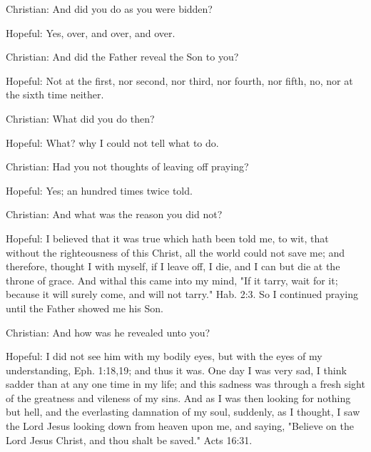 Christian: And did you do as you were bidden?

Hopeful: Yes, over, and over, and over.

Christian: And did the Father reveal the Son to you?

Hopeful: Not at the first, nor second, nor third, nor fourth, nor
fifth, no, nor at the sixth time neither.

Christian: What did you do then?

Hopeful: What? why I could not tell what to do.

Christian: Had you not thoughts of leaving off praying?

Hopeful: Yes; an hundred times twice told.

Christian: And what was the reason you did not?

Hopeful: I believed that it was true which hath been told me, to wit,
that without the righteousness of this Christ, all the world could not
save me; and therefore, thought I with myself, if I leave off, I die,
and I can but die at the throne of grace. And withal this came into my
mind, "If it tarry, wait for it; because it will surely come, and will
not tarry." Hab. 2:3. So I continued praying until the Father showed me
his Son.

Christian: And how was he revealed unto you?

Hopeful: I did not see him with my bodily eyes, but with the eyes of my
understanding, Eph. 1:18,19; and thus it was. One day I was very sad, I
think sadder than at any one time in my life; and this sadness was
through a fresh sight of the greatness and vileness of my sins. And as
I was then looking for nothing but hell, and the everlasting damnation
of my soul, suddenly, as I thought, I saw the Lord Jesus looking down
from heaven upon me, and saying, "Believe on the Lord Jesus Christ, and
thou shalt be saved." Acts 16:31.

